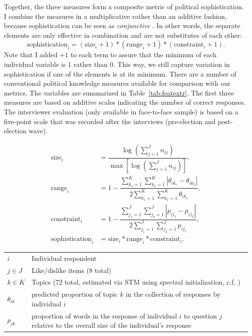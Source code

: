 \documentclass[12pt]{article}
\begin{document}
Together, the three measures form a composite metric of political sophistication. I combine the measures in a multiplicative rather than an additive fashion, because sophistication can be seen as \textsl{conjunctive} \citep[see][]{luskin1987measuring}. In other words, the separate elements are only effective in combination and are not substitutes of each other:
\begin{equation}
\text{sophistication}_i = (\text{size}_i + 1) * (\text{range}_i + 1) * (\text{constraint}_i + 1).
\end{equation}
Note that I added $+1$ to each term to assure that the minimum of each individual variable is 1 rather than 0. This way, we still capture variation in sophistication if one of the elements is at its minimum. There are a number of conventional political knowledge measures available for comparison with our metrics. The variables are summarized in Table~\ref{tab:featextr}. The first three measures are based on additive scales indicating the number of correct responses. The interviewer evaluation (only available in face-to-face sample) is based on a five-point scale that was recorded after the interviews (pre-election and post-election wave).

\begin{align}
\text{size}_i &= \dfrac{\log\left(\sum_{j=1}^J n_{ij}\right)}{\max\left[\log\left(\sum_{j=1}^J n_{ij}\right)\right]},\\
\text{range}_i &= 1-\dfrac{\sum_{k_1=1}^K\sum_{k_2=1}^K |\theta_{ik_1} - \theta_{ik_2}|}{2\sum_{k_1=1}^K\sum_{k_2=1}^K \theta_{ik_1}},\\
\text{constraint}_i &= 1-\dfrac{\sum_{j_1=1}^J\sum_{j_2=1}^J |p_{ij_1} - p_{ij_2}|}{2\sum_{j_1=1}^J\sum_{j_2=1}^J p_{ij_1}},\\
\text{sophistication}_i &= \text{size}_i * \text{range}_i * \text{constraint}_i.
\end{align}

\begin{center}\singlespacing
\begin{tabular}{lp{15cm}}
\toprule 
$i$ & Individual respondent \\
$j \in J$ & Like/dislike items (8 total) \\
$k \in K$ & Topics (72 total, estimated via STM using spectral initialization, c.f. \citealt{roberts2014structural}) \\
$\theta_{ik}$ & predicted proportion of topic $k$ in the collection of responses by individual $i$\\
$p_{jk}$ & proportion of words in the response of individual $i$ to question $j$ relative to the overall size of the individual's response\\
\bottomrule
\end{tabular}
\end{center}
\end{document}

